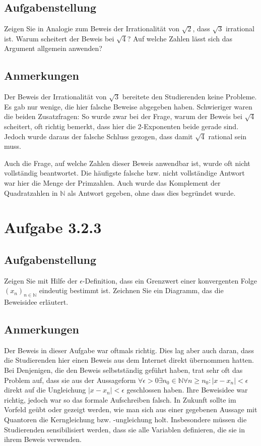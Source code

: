 \documentclass[a4paper]{article}
\newcommand*{\N}{\mathbb N}
\begin{document}
\subsection{Aufgabenstellung}

Zeigen Sie in Analogie zum Beweis der Irrationalität von $\sqrt 2$, dass $\sqrt 3$ irrational ist. Warum scheitert der Beweis bei $\sqrt 4$? Auf welche Zahlen lässt sich das Argument allgemein anwenden?

\subsection{Anmerkungen}

Der Beweis der Irrationalität von $\sqrt 3$ bereitete den Studierenden keine Probleme. Es gab nur wenige, die hier falsche Beweise abgegeben haben. Schwieriger waren die beiden Zusatzfragen: So wurde zwar bei der Frage, warum der Beweis bei $\sqrt 4$ scheitert, oft richtig bemerkt, dass hier die 2-Exponenten beide gerade sind. Jedoch wurde daraus der falsche Schluss gezogen, dass damit $\sqrt 4$ rational sein muss.

Auch die Frage, auf welche Zahlen dieser Beweis anwendbar ist, wurde oft nicht vollständig beantwortet. Die häufigste falsche bzw. nicht vollständige Antwort war hier die Menge der Primzahlen. Auch wurde das Komplement der Quadratzahlen in $\N$ als Antwort gegeben, ohne dass dies begründet wurde.

\section{Aufgabe 3.2.3}

\subsection{Aufgabenstellung}

Zeigen Sie mit Hilfe der $\epsilon$-Definition, dass ein Grenzwert einer konvergenten Folge $(x_n)_{n\in\N}$ eindeutig bestimmt ist. Zeichnen Sie ein Diagramm, das die Beweisidee erläutert.

\subsection{Anmerkungen}

Der Beweis in dieser Aufgabe war oftmals richtig. Dies lag aber auch daran, dass die Studierenden hier einen Beweis aus dem Internet direkt übernommen hatten. Bei Denjenigen, die den Beweis selbstständig geführt haben, trat sehr oft das Problem auf, dass sie aus der Aussageform $\forall \epsilon > 0 \exists n_0 \in\N\forall n\ge n_0 : |x-x_n| < \epsilon$ direkt auf die Ungleichung $|x-x_n|<\epsilon$ geschlossen haben. Ihre Beweisidee war richtig, jedoch war so das formale Aufschreiben falsch. In Zukunft sollte im Vorfeld geübt oder gezeigt werden, wie man sich aus einer gegebenen Aussage mit Quantoren die Kerngleichung bzw. -ungleichung holt. Insbesondere müssen die Studierenden sensibilisiert werden, dass sie alle Variablen definieren, die sie in ihrem Beweis verwenden.
\end{document}
